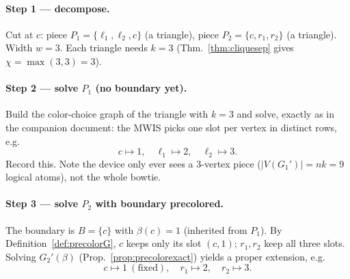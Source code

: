 \documentclass[11pt]{article}
\theoremstyle{definition}
\theoremstyle{remark}
\begin{document}
\begin{center}
\end{center}

\paragraph{Step 1 --- decompose.} Cut at $c$: piece $P_1=\{\ell_1,\ell_2,c\}$
(a triangle), piece $P_2=\{c,r_1,r_2\}$ (a triangle). Width $w=3$. Each triangle
needs $k=3$ (Thm.~\ref{thm:cliquesep} gives $\chi=\max(3,3)=3$).

\paragraph{Step 2 --- solve $P_1$ (no boundary yet).} Build the color-choice graph
of the triangle with $k=3$ and solve, exactly as in the companion document: the
MWIS picks one slot per vertex in distinct rows, e.g.
\[
   c\mapsto 1,\quad \ell_1\mapsto 2,\quad \ell_2\mapsto 3.
\]
Record this. Note the device only ever sees a $3$-vertex piece
($|V(G_1')|=nk=9$ logical atoms), not the whole bowtie.

\paragraph{Step 3 --- solve $P_2$ with boundary precolored.} The boundary is
$B=\{c\}$ with $\beta(c)=1$ (inherited from $P_1$). By
Definition~\ref{def:precolorG}, $c$ keeps only its slot $(c,1)$; $r_1,r_2$ keep all
three slots. Solving $G_2'(\beta)$ (Prop.~\ref{prop:precolorexact}) yields a proper
extension, e.g.
\[
   c\mapsto 1\ (\text{fixed}),\quad r_1\mapsto 2,\quad r_2\mapsto 3.
\]

\begin{center}
\end{center}
\end{document}
